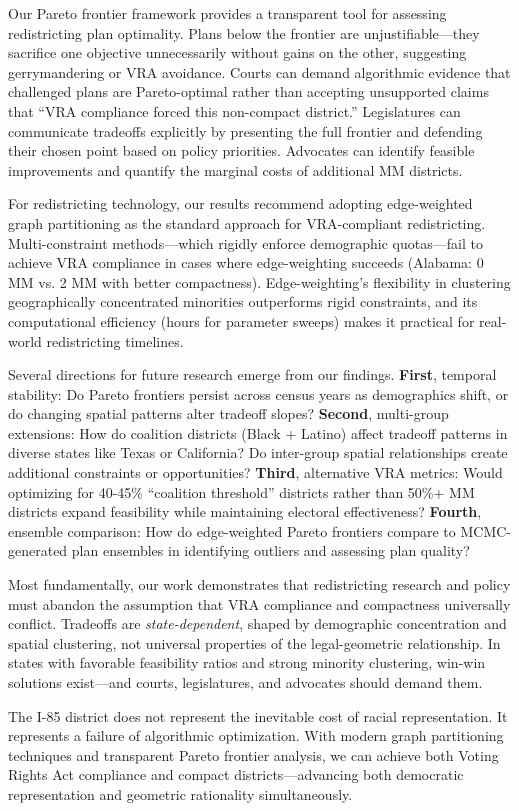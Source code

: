 Our Pareto frontier framework provides a transparent tool for assessing redistricting plan optimality. Plans below the frontier are unjustifiable---they sacrifice one objective unnecessarily without gains on the other, suggesting gerrymandering or VRA avoidance. Courts can demand algorithmic evidence that challenged plans are Pareto-optimal rather than accepting unsupported claims that ``VRA compliance forced this non-compact district.'' Legislatures can communicate tradeoffs explicitly by presenting the full frontier and defending their chosen point based on policy priorities. Advocates can identify feasible improvements and quantify the marginal costs of additional MM districts.

For redistricting technology, our results recommend adopting edge-weighted graph partitioning as the standard approach for VRA-compliant redistricting. Multi-constraint methods---which rigidly enforce demographic quotas---fail to achieve VRA compliance in cases where edge-weighting succeeds (Alabama: 0 MM vs. 2 MM with better compactness). Edge-weighting's flexibility in clustering geographically concentrated minorities outperforms rigid constraints, and its computational efficiency (hours for parameter sweeps) makes it practical for real-world redistricting timelines.

Several directions for future research emerge from our findings. \textbf{First}, temporal stability: Do Pareto frontiers persist across census years as demographics shift, or do changing spatial patterns alter tradeoff slopes? \textbf{Second}, multi-group extensions: How do coalition districts (Black + Latino) affect tradeoff patterns in diverse states like Texas or California? Do inter-group spatial relationships create additional constraints or opportunities? \textbf{Third}, alternative VRA metrics: Would optimizing for 40-45\% ``coalition threshold'' districts rather than 50\%+ MM districts expand feasibility while maintaining electoral effectiveness? \textbf{Fourth}, ensemble comparison: How do edge-weighted Pareto frontiers compare to MCMC-generated plan ensembles in identifying outliers and assessing plan quality?

Most fundamentally, our work demonstrates that redistricting research and policy must abandon the assumption that VRA compliance and compactness universally conflict. Tradeoffs are \emph{state-dependent}, shaped by demographic concentration and spatial clustering, not universal properties of the legal-geometric relationship. In states with favorable feasibility ratios and strong minority clustering, win-win solutions exist---and courts, legislatures, and advocates should demand them.

The I-85 district does not represent the inevitable cost of racial representation. It represents a failure of algorithmic optimization. With modern graph partitioning techniques and transparent Pareto frontier analysis, we can achieve both Voting Rights Act compliance and compact districts---advancing both democratic representation and geometric rationality simultaneously.
